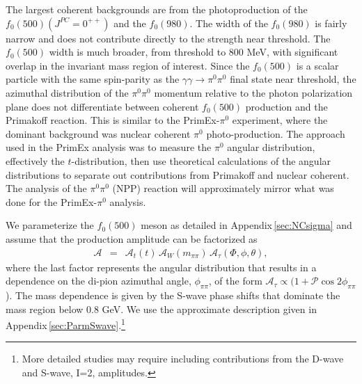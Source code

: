  The largest coherent backgrounds are  
from the photoproduction of the $f_0(500)(J^{PC}=0^{++})$ and the $f_0(980)$.  The width of the
$f_0(980)$ is fairly narrow and does not contribute directly to the strength near threshold.
The $f_0(500)$ width is much
broader, from threshold to 800 MeV, with significant overlap in the
invariant mass region of interest.  Since the $f_0(500)$ is a scalar
particle with the same spin-parity as the $\gamma \gamma \rightarrow
\pi^0\pi^0$ final state near threshold, the azimuthal distribution of the $\pi^0\pi^0$ momentum relative to the
photon polarization plane does not differentiate between coherent
$f_0(500)$ production and the Primakoff reaction.  
This is similar to the PrimEx-$\pi^0$ experiment, where the dominant background was
nuclear coherent $\pi^0$ photo-production.  The approach used in the
PrimEx analysis was to measure the $\pi^0$ angular distribution,
effectively the $t$-distribution, then use theoretical calculations of
the angular distributions to separate out contributions from Primakoff
and nuclear coherent. The analysis of the $\pi^0\pi^0$ (NPP) reaction
will approximately mirror what was done for the PrimEx-$\pi^0$
analysis.  

We parameterize the $f_{0}(500)$ meson as detailed in Appendix\,\ref{sec:NCsigma} and assume that the production amplitude can be factorized as
\begin{eqnarray}
\mathcal{A} & = & \mathcal{A}_t(t) \, \mathcal{A}_W(m_{\pi\pi}) \, \mathcal{A}_\tau(\Phi, \phi, \theta),
\end{eqnarray}
where the last factor represents the angular distribution that results in a 
dependence on the di-pion azimuthal angle, $\phi_{\pi\pi}$, of the form $\mathcal{A}_\tau \propto (1 + \mathcal{P} \cos{2\phi_{\pi\pi}}$). 
The mass dependence is given by the S-wave phase shifts that dominate the mass region below 0.8 GeV. We use the approximate description given in 
Appendix\,\ref{sec:ParmSwave}.\footnote{More detailed studies may require including contributions from the D-wave and S-wave, I=2, amplitudes.} 

